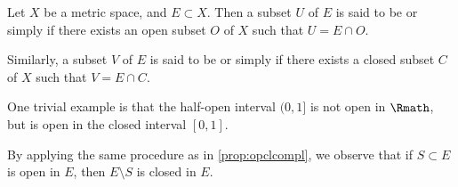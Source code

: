 \begin{definition}
    \label{def:reltop}
    Let \(X\) be a metric space,
    and \(E\subset X\).
    Then a subset \(U\) of \(E\) is said to be
    or simply 
    if there exists an open subset \(O\) of \(X\) such that
    \(U=E\cap O\).

    Similarly, a subset \(V\) of \(E\) is said to be
    or simply 
    if there exists a closed subset \(C\) of \(X\) such that
    \(V=E\cap C\).
\end{definition}

One trivial example is that
the half-open interval \((0,1]\) is not open in \(\Rmath\),
but is open in the closed interval \([0,1]\).

By applying the same procedure as in \cref{prop:opclcompl},
we observe that
if \(S\subset E\) is open in \(E\),
then \(E\setminus S\) is closed in \(E\).